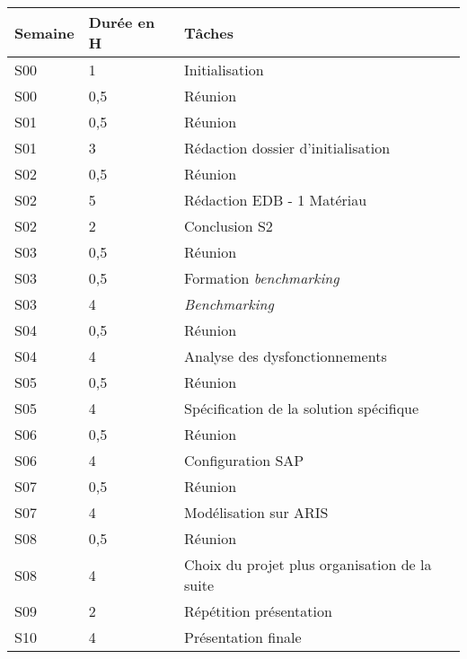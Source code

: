 \begin{longtable}{|l|l|l|}
\hline
Semaine&Durée en H&Tâches\\
\hline
S00&1&Initialisation\\
\hline
S00&0,5&Réunion\\
\hline
S01&0,5&Réunion\\
\hline
S01&3&Rédaction dossier d'initialisation\\
\hline
S02&0,5&Réunion\\
\hline
S02&5&Rédaction EDB - 1 Matériau\\
\hline
S02&2&Conclusion S2\\
\hline
S03&0,5&Réunion\\
\hline
S03&0,5&Formation \textsl{benchmarking}\\
\hline
S03&4&\textsl{Benchmarking}\\
\hline
S04&0,5&Réunion\\
\hline
S04&4&Analyse des dysfonctionnements\\
\hline
S05&0,5&Réunion\\
\hline
S05&4&Spécification de la solution spécifique\\
\hline
S06&0,5&Réunion\\
\hline
S06&4&Configuration SAP\\
\hline
S07&0,5&Réunion\\
\hline
S07&4&Modélisation sur ARIS\\
\hline
S08&0,5&Réunion\\
\hline
S08&4&Choix du projet plus organisation de la suite\\
\hline
S09&2&Répétition présentation\\
\hline
S10&4&Présentation finale\\
\hline
\end{longtable}


\pagebreak

